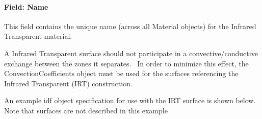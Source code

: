 \paragraph{Field: Name}\label{field-name-2-037}

This field contains the unique name (across all Material objects) for the Infrared Transparent material.

A Infrared Transparent surface should not participate in a convective/conductive exchange between the zones it separates.~ In order to minimize this effect, the ConvectionCoefficients object must be used for the surfaces referencing the Infrared Transparent (IRT) construction.

An example idf object specification for use with the IRT surface is shown below. Note that surfaces are not described in this example

